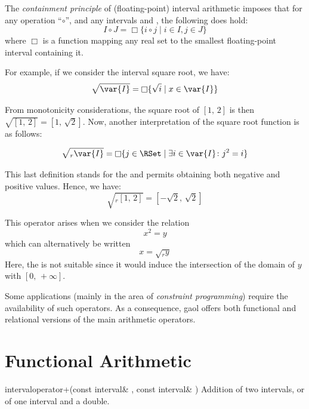 \documentclass{manual}
\newcommand{\itv}[2]{\ensuremath{[#1,\,#2]}}
\newcommand{\hull}[1]{\ensuremath{\mathop{\Box} #1}}
\begin{document}
The \emph{containment principle} of (floating-point) interval arithmetic
imposes that for any operation ``$\circ$'', and any intervals  and ,
the following does hold:
\begin{equation*}
I\circ J= \hull{\{i\circ j\mid i\in I, j\in J\}}
\end{equation*}
where \hull{} is a function mapping any real set to the
smallest floating-point interval containing it.

For example, if we consider the interval square root, we have:
\begin{equation*}
\sqrt{\var{I}} = \hull{\{\sqrt{i}\mid x\in \var{I}\}}
\end{equation*}

From monotonicity considerations, the square root of \itv{1}{2} is then
$\sqrt{\itv{1}{2}}=\itv{1}{\sqrt{2}}$. Now, another
interpretation of the square root function is as follows:

\begin{equation*}
\sqrt{_r\var{I}} = \hull{\{j\in\RSet\mid\exists i\in \var{I}\colon j^2=i\}}
\end{equation*}

This last definition stands for the  and
permits obtaining both negative and positive values. Hence, we have:
\begin{equation*}
\sqrt{_r\itv{1}{2}} = \itv{-\sqrt{2}}{\sqrt{2}}
\end{equation*}

This operator arises when we consider the relation
\begin{equation*}
x^2= y
\end{equation*}
which can alternatively be written
\begin{equation*}
x=\sqrt{_r y}
\end{equation*}
Here, the  is not suitable since it would
induce the intersection of the domain of $y$ with \itv{0}{+\infty}.

Some applications (mainly in the area of \emph{constraint programming})
require the availability of such operators. As a consequence, gaol offers
both functional and relational versions of the main arithmetic operators.

\section{Functional Arithmetic}

\begin{deffun}{interval}{operator+}{(const interval\& , const interval\& )}
  Addition of two intervals, or of one interval and a double.
\end{deffun}
\end{document}
